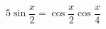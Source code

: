 \begin{ex}[type=equation]
	\begin{condition}
		$\ 5\sin {\dfrac{x}{2}} = \cos {\dfrac{x}{2}}\cos{\dfrac{x}{4}}$
	\end{condition}
\end{ex}